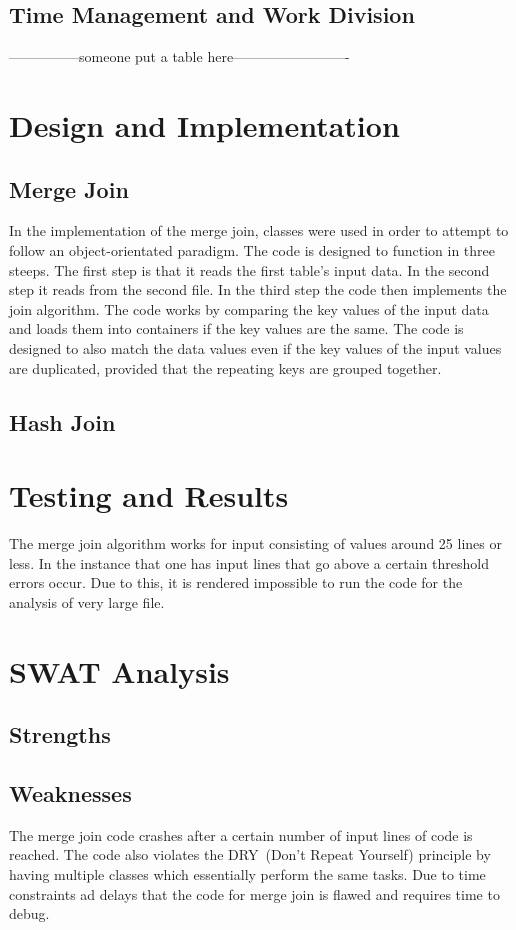 \documentclass[conference, 11pt]{IEEEtran}
\begin{document}
	\subsection{Time Management and Work Division}
	---------------someone put a table here-------------------------
	
	
\section{Design and Implementation}
	
	\subsection{Merge Join}
	In the implementation of the merge join, classes were used in order to attempt to follow an object-orientated paradigm. The code is designed to function in three steeps. The first step is that it reads the first table's input data. In the second step it reads from the second file. In the third step the code then implements the join algorithm. The code works by comparing the key values of the input data and loads them into containers if the key values are the same. The code is designed to also match the data values even if the key values of the input values are duplicated, provided that the repeating keys are grouped together.
	
	\subsection{Hash Join}

\section{Testing and Results}
	
The merge join algorithm works for input consisting of values around 25 lines or less. In the instance that one has input lines that go above a certain threshold errors occur.  Due to this, it is rendered impossible to run the code for the analysis of very large file. 


\section{SWAT Analysis}
	\subsection{Strengths}
	
	\subsection{Weaknesses}
	The merge join code crashes after a certain number of input lines of code is reached. The code also violates the DRY~(Don't Repeat Yourself) principle by having multiple classes which essentially perform the same tasks. Due to time constraints ad delays that the code for merge join is flawed and requires time to debug.
\end{document}
